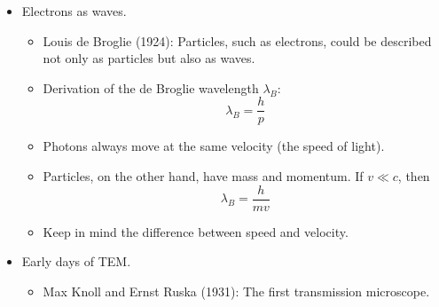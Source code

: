 \documentclass[../notes.tex]{subfiles}
\begin{document}
\begin{itemize}
    \begin{figure}[H]
        \centering
        \texttt{[image: oilDropExp.png]}
        \caption{Oil-drop experiment.}
        \label{fig:oilDropExp}
    \end{figure}
    \begin{itemize}
        \item Robert Millikan (1910 at UChicago): Oil-drop experiment.
        \item X-rays interact with the oil and produce (a) charge(s) that is/are confined within a droplet.
        \item No charge applied: The fall of the droplet is determined by its mass and the medium's viscosity.
        \item Charge applied: The droplets stopped falling or even rose (depending on the number of charges).
        \item The position of droplets was dependent on the applied voltage.
        \item Millikan measured the electronic charge to two sig figs: \SI{1.6e-19}{\coulomb}.
    \end{itemize}
    \item Electrons as waves.
    \begin{itemize}
        \item Louis de Broglie (1924): Particles, such as electrons, could be described not only as particles but also as waves.
        \item Derivation of the de Broglie wavelength $\lambda_B$:
        \begin{equation*}
            \lambda_B = \frac{h}{p}
        \end{equation*}
        \item Photons always move at the same velocity (the speed of light).
        \item Particles, on the other hand, have mass and momentum. If $v\ll c$, then
        \begin{equation*}
            \lambda_B = \frac{h}{mv}
        \end{equation*}
        \item Keep in mind the difference between speed and velocity.
    \end{itemize}
    \item Early days of TEM.
    \begin{itemize}
        \item Max Knoll and Ernst Ruska (1931): The first transmission microscope.

\end{itemize}
\end{itemize}
\end{document}
